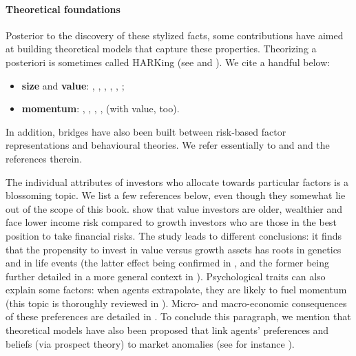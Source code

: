 \paragraph{Theoretical foundations}

Posterior to the discovery of these stylized facts, some contributions have aimed at building theoretical models that capture these properties. Theorizing a posteriori is sometimes called HARKing (see \cite{kerr1998harking} and \cite{hollenbeck2017harking}). We cite a handful below:

\begin{itemize}
\item \textbf{size} and \textbf{value}: \cite{berk1999optimal}, \cite{daniel2001overconfidence}, \cite{barberis2003style}, \cite{gomes2003equilibrium}, \cite{carlson2004corporate}, \cite{arnott2014can};
\item \textbf{momentum}: \cite{johnson2002rational}, \cite{grinblatt2005prospect}, \cite{vayanos2013institutional}, \cite{choi2014momentum}, \cite{li2018explaining} (with value, too).
\end{itemize}

In addition, bridges have also been built between risk-based factor representations and behavioural theories. We refer essentially to \cite{barberis2016prospect} and \cite{daniel2019short} and the references therein.

The individual attributes of investors who allocate towards particular factors is a blossoming topic. We list a few references below, even though they somewhat lie out of the scope of this book. \cite{betermier2017value} show that value investors are older, wealthier and face lower income risk compared to growth investors who are those in the best position to take financial risks. The study \cite{cronqvist2015value} leads to different conclusions: it finds that the propensity to invest in value versus growth assets has roots in genetics and in life events (the latter effect being confirmed in \cite{cocco2019evidence}, and the former being further detailed in a more general context in \cite{cronqvist2015value}). Psychological traits can also explain some factors: when agents extrapolate, they are likely to fuel momentum (this topic is thoroughly reviewed in \cite{barberis2018psychology}). Micro- and macro-economic consequences of these preferences are detailed in \cite{bhamra2019does}. To conclude this paragraph, we mention that theoretical models have also been proposed that link agents' preferences and beliefs (via prospect theory) to market anomalies (see for instance \cite{du2020deep}).

